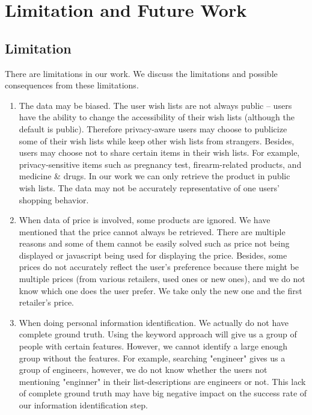 \section{Limitation and Future Work}
\subsection{Limitation}
There are limitations in our work. We discuss the limitations and possible consequences from these limitations. 
\begin{enumerate}
\item The data may be biased. The user wish lists are not always public -- users have the ability to change the accessibility of their wish lists (although the default is public). Therefore privacy-aware users may choose to publicize some of their wish lists while keep other wish lists from strangers. Besides, users may choose not to share certain items in their wish lists. For example, privacy-sensitive items such as pregnancy test, firearm-related products, and medicine \& drugs. In our work we can only retrieve the product in public wish lists. The data may not be accurately representative of one users' shopping behavior.

\item When data of price is involved, some products are ignored. We have mentioned that the price cannot always be retrieved. There are multiple reasons and some of them cannot be easily solved such as price not being displayed or javascript being used for displaying the price. Besides, some prices do not accurately reflect the user's preference because there might be multiple prices (from various retailers, used ones or new ones), and we do not know which one does the user prefer. We take only the new one and the first retailer's price. 

\item When doing personal information identification. We actually do not have complete ground truth. Using the keyword approach will give us a group of people with certain features. However, we cannot identify a large enough group without the features. For example, searching "engineer" gives us a group of engineers, however, we do not know whether the users not mentioning "enginner" in their list-descriptions are engineers or not. This lack of complete ground truth may have big negative impact on the success rate of our information identification step.

\end{enumerate}
